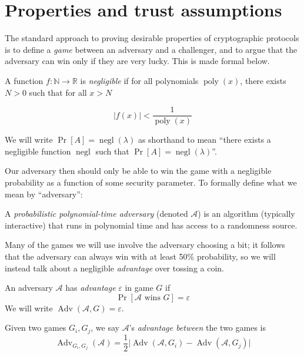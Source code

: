 \documentclass[12pt,a4paper]{article}
\DeclareMathOperator{\poly}{\text{poly}}
\DeclareMathOperator{\negl}{\text{negl}}
\DeclareMathOperator{\Adv}{\text{Adv}}
\theoremstyle{definition}
\begin{document}
\section{Properties and trust assumptions}\label{sec-properties}
The standard approach to proving desirable properties of cryptographic protocols is to define a \textit{game} between an adversary and a challenger, and to argue that the adversary can win only if they are very lucky. This is made formal below.
\begin{definition}
    A function $f:\mathbb{N}\rightarrow\mathbb{R}$ is \textit{negligible} if for all polynomials $\poly(x)$, there exists $N>0$ such that for all $x>N$

    $$|f(x)|<\frac{1}{\poly(x)}$$

    We will write $\Pr[A]=\negl(\lambda)$ as shorthand to mean ``there exists a negligible function $\negl$ such that $\Pr[A]=\negl(\lambda)$''.
\end{definition}
Our adversary then should only be able to win the game with a negligible probability as a function of some security parameter. To formally define what we mean by ``adversary'':
\begin{definition}
    A \textit{probabilistic polynomial-time adversary} (denoted $\mathcal{A}$) is an algorithm (typically interactive) that runs in polynomial time and has access to a randomness source.
\end{definition}
Many of the games we will use involve the adversary choosing a bit; it follows that the adversary can always win with at least 50\% probability, so we will instead talk about a negligible \textit{advantage} over tossing a coin. 
\begin{definition}[Advantage]
    An adversary $\mathcal{A}$ has \textit{advantage} $\varepsilon$ in game $G$ if
    $$\Pr\left[\mathcal{A}\text{ wins }G\right]=\varepsilon$$
    We will write $\Adv(\mathcal{A}, G)=\varepsilon$.

    Given two games $G_i, G_j$, we say $\mathcal{A}$'s \textit{advantage between} the two games is
    $$\Adv_{G_i, G_j}(\mathcal{A}) = \frac{1}{2}
    \Big|
        \Adv(\mathcal{A}, G_i)
         -
        \Adv(\mathcal{A}, G_j)
    \Big|$$
\end{definition}
\end{document}
